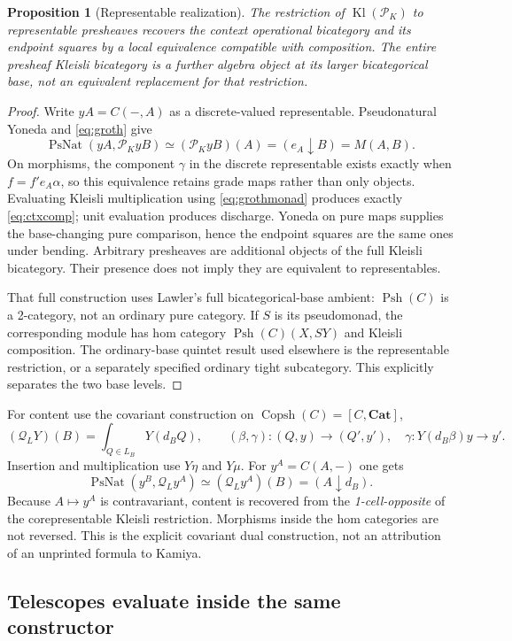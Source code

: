 \documentclass[11pt]{article}
\newtheorem{proposition}[theorem]{Proposition}
\theoremstyle{definition}
\newcommand{\Cat}{\mathbf{Cat}}
\newcommand{\Ps}{\operatorname{PsNat}}
\newcommand{\Kl}{\operatorname{Kl}}
\newcommand{\Psh}{\operatorname{Psh}}
\newcommand{\Copsh}{\operatorname{Copsh}}
\begin{document}
\begin{proposition}[Representable realization]\label{prop:groth}
The restriction of $\Kl(\mathcal P_K)$ to representable presheaves recovers
the context operational bicategory and its endpoint squares by a local
equivalence compatible with composition. The entire presheaf Kleisli
bicategory is a further algebra object at its larger bicategorical base,
not an equivalent replacement for that restriction.
\end{proposition}
\begin{proof}
Write $yA=C(-,A)$ as a discrete-valued representable. Pseudonatural Yoneda
and \eqref{eq:groth} give
\[
 \Ps(yA,\mathcal P_KyB)\simeq(\mathcal P_KyB)(A)
                 =(e_A\downarrow B)=M(A,B).
\]
On morphisms, the component $\gamma$ in the discrete representable exists
exactly when $f=f'e_A\alpha$, so this equivalence retains grade maps rather
than only objects. Evaluating Kleisli multiplication using
\eqref{eq:grothmonad} produces exactly \eqref{eq:ctxcomp}; unit evaluation
produces discharge. Yoneda on pure maps supplies the base-changing pure
comparison, hence the endpoint squares are the same ones under bending.
Arbitrary presheaves are additional objects of the full Kleisli bicategory.
Their presence does not imply they are equivalent to representables.

That full construction uses Lawler's full bicategorical-base ambient:
$\Psh(C)$ is a 2-category, not an ordinary pure category. If $S$ is its
pseudomonad, the corresponding module has hom category
$\Psh(C)(X,SY)$ and Kleisli composition. The ordinary-base quintet result
used elsewhere is the representable restriction, or a separately specified
ordinary tight subcategory. This explicitly separates the two base levels.
\end{proof}

For content use the covariant construction on $\Copsh(C)=[C,\Cat]$,
\[
 (\mathcal Q_LY)(B)=\int_{Q\in L_B}Y(d_BQ),\qquad
 (\beta,\gamma):(Q,y)\to(Q',y'),\quad
 \gamma:Y(d_B\beta)y\to y'.
\]
Insertion and multiplication use $Y\eta$ and $Y\mu$. For
$y^A=C(A,-)$ one gets
\[
 \Ps(y^B,\mathcal Q_Ly^A)\simeq(\mathcal Q_Ly^A)(B)
                        =(A\downarrow d_B).
\]
Because $A\mapsto y^A$ is contravariant, content is recovered from the
\emph{1-cell-opposite} of the corepresentable Kleisli restriction. Morphisms
inside the hom categories are not reversed. This is the explicit covariant
dual construction, not an attribution of an unprinted formula to Kamiya.

\subsection{Telescopes evaluate inside the same constructor}
\end{document}
